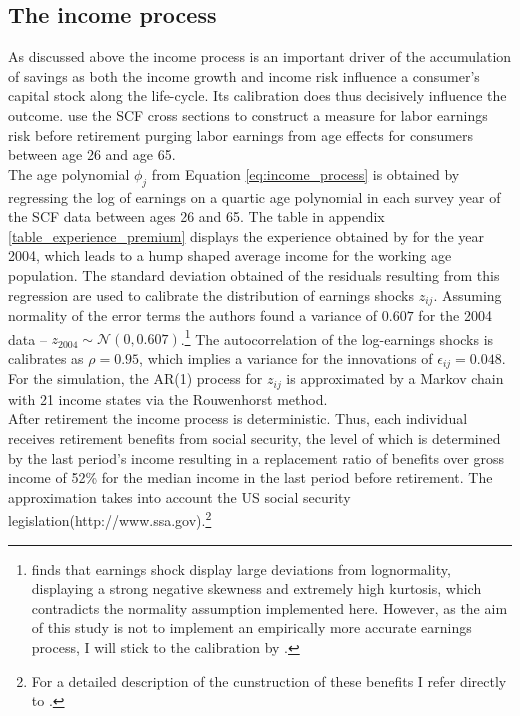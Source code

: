 \documentclass[a4paper,12pt,legno]{article}
\begin{document}
\subsection{The income process}
As discussed above the income process is an important driver of the accumulation of savings as both the income growth and income risk influence a consumer's capital stock along the life-cycle. Its calibration does thus decisively influence the outcome. 
\cite{hintermaier2011} use the SCF cross sections to construct a measure for labor earnings risk before retirement purging labor earnings from age effects for consumers between age 26 and age 65.\\ 
The age polynomial $\phi_{j}$ from Equation \ref{eq:income_process} is obtained by regressing the log of earnings on a quartic age polynomial in each survey year of the SCF data between ages 26 and 65. The table in appendix \ref{table_experience_premium} displays the experience obtained by \cite{hintermaier2011} for the year 2004, which leads to a hump shaped average income for the working age population.
The standard deviation obtained of the residuals resulting from this regression are used to calibrate the distribution of earnings shocks $z_{ij}$. Assuming normality of the error terms the authors found a variance of $0.607$ for the 2004 data \---  $z_{2004} \sim \mathcal{N}(0,0.607)$.\footnote{\cite{guvenen2015data} finds that earnings shock display large deviations from lognormality, displaying a strong negative skewness and extremely high kurtosis, which contradicts the normality assumption implemented here. However, as the aim of this study is not to implement an empirically more accurate earnings process, I will stick to the calibration by \cite{hintermaier2011}.} The autocorrelation of the log-earnings shocks is calibrates as $\rho = 0.95$, which implies a variance for the innovations of $\epsilon_{ij} = 0.048$. For the simulation, the AR(1) process for $z_{ij}$ is approximated by a Markov chain with 21 income states via the Rouwenhorst method. \\
After retirement the income process is deterministic. Thus, each individual receives retirement benefits from social security, the level of which is determined by the last period's income resulting in a replacement ratio of benefits over gross income of 52\% for the median income in the last period before retirement. The approximation takes into account the US social security legislation(http://www.ssa.gov).\footnote{For a detailed description of the cunstruction of these benefits I refer directly to \cite{hintermaier2011}.} \\
\end{document}
